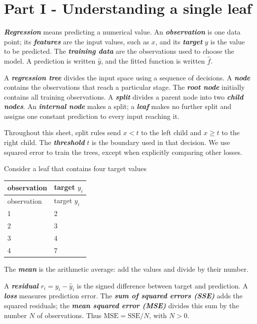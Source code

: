 \documentclass{course_sheet}
\begin{document}
\clearpage
\section*{Part I - Understanding a single leaf}
\textbf{\textit{Regression}} means predicting a numerical value. An \textbf{\textit{observation}} is one data point; its \textbf{\textit{features}} are the input values, such as $x$, and its \textbf{\textit{target}} $y$ is the value to be predicted. The \textbf{\textit{training data}} are the observations used to choose the model. A prediction is written $\hat y$, and the fitted function is written $\hat f$.

A \textbf{\textit{regression tree}} divides the input space using a sequence of decisions. A \textbf{\textit{node}} contains the observations that reach a particular stage. The \textbf{\textit{root node}} initially contains all training observations. A \textbf{\textit{split}} divides a parent node into two \textbf{\textit{child nodes}}. An \textbf{\textit{internal node}} makes a split; a \textbf{\textit{leaf}} makes no further split and assigns one constant prediction to every input reaching it.

Throughout this sheet, split rules send $x<t$ to the left child and $x\geq t$ to the right child. The \textbf{\textit{threshold}} $t$ is the boundary used in that decision. We use squared error to train the trees, except when explicitly comparing other losses.

Consider a leaf that contains four target values

\begingroup
\small
\setlength{\tabcolsep}{4pt}
\begin{longtable}{l|l}
observation & target $y_i$ \\
\hline
\endfirsthead
observation & target $y_i$ \\
\hline
\endhead
1 & 2 \\[1.5pt]
2 & 3 \\[1.5pt]
3 & 4 \\[1.5pt]
4 & 7 \\[1.5pt]
\end{longtable}
\endgroup
The \textbf{\textit{mean}} is the arithmetic average: add the values and divide by their number.

A \textbf{\textit{residual}} $r_i=y_i-\hat y_i$ is the signed difference between target and prediction. A \textbf{\textit{loss}} measures prediction error. The \textbf{\textit{sum of squared errors (SSE)}} adds the squared residuals; the \textbf{\textit{mean squared error (MSE)}} divides this sum by the number $N$ of observations. Thus $\mathrm{MSE}=\mathrm{SSE}/N$, with $N>0$.
\end{document}
